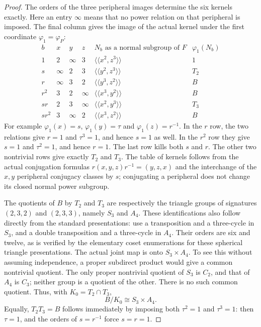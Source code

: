 \begin{proof}
The orders of the three peripheral images determine the
six kernels exactly.  Here an entry $\infty$ means that
no power relation on that peripheral is imposed.  The final
column gives the image of the actual kernel under the first
coordinate $\varphi_1=\varphi_P$:
\[
\begin{array}{c|ccc|l|c}
 b&x&y&z&N_b\text{ as a normal subgroup of }F&\varphi_1(N_b)\\ \hline
 1&2&\infty&3&\langle\!\langle x^2,z^3\rangle\!\rangle&1\\
 s&\infty&2&3&\langle\!\langle y^2,z^3\rangle\!\rangle&T_2\\
 r&\infty&3&2&\langle\!\langle y^3,z^2\rangle\!\rangle&B\\
 r^2&3&2&\infty&\langle\!\langle x^3,y^2\rangle\!\rangle&B\\
 sr&2&3&\infty&\langle\!\langle x^2,y^3\rangle\!\rangle&T_3\\
 sr^2&3&\infty&2&\langle\!\langle x^3,z^2\rangle\!\rangle&B
\end{array}                                                     \tag{B.R5}
\]
For example $\varphi_1(x)=s$, $\varphi_1(y)=\tau$ and
$\varphi_1(z)=r^{-1}$.  In the $r$ row, the two relations
give $r=1$ and $\tau^3=1$, and hence $s=1$ as well.  In the
$r^2$ row they give $s=1$ and $\tau^2=1$, and hence $r=1$.
The last row kills both $s$ and $r$.  The other two nontrivial
rows give exactly $T_2$ and $T_3$.  The table of kernels
follows from the actual conjugation formulas
$r(x,y,z)r^{-1}=(y,z,x)$ and the interchange of the $x,y$
peripheral conjugacy classes by $s$; conjugating a peripheral
does not change its closed normal power subgroup.

The quotients of $B$ by $T_2$ and $T_3$ are respectively
the triangle groups of signatures $(2,3,2)$ and $(2,3,3)$,
namely $S_3$ and $A_4$.  These identifications also follow
directly from the standard presentations: use a transposition
and a three-cycle in $S_3$, and a double transposition and
a three-cycle in $A_4$.  Their orders are six and twelve,
as is verified by the elementary coset enumerations for
these spherical triangle presentations.  The actual joint
map is onto $S_3\times A_4$.  To see this without assuming
independence, a proper subdirect product would give a common
nontrivial quotient.  The only proper nontrivial quotient
of $S_3$ is $C_2$, and that of $A_4$ is $C_3$; neither
group is a quotient of the other.  There is no such common
quotient.  Thus, with $K_0=T_2\cap T_3$,
\[
                 B/K_0\cong S_3\times A_4.                     \tag{B.R6}
\]
Equally, $T_2T_3=B$ follows immediately by imposing both
$\tau^2=1$ and $\tau^3=1$: then $\tau=1$, and the
orders of $s=r^{-1}$ force $s=r=1$.


\end{proof}
